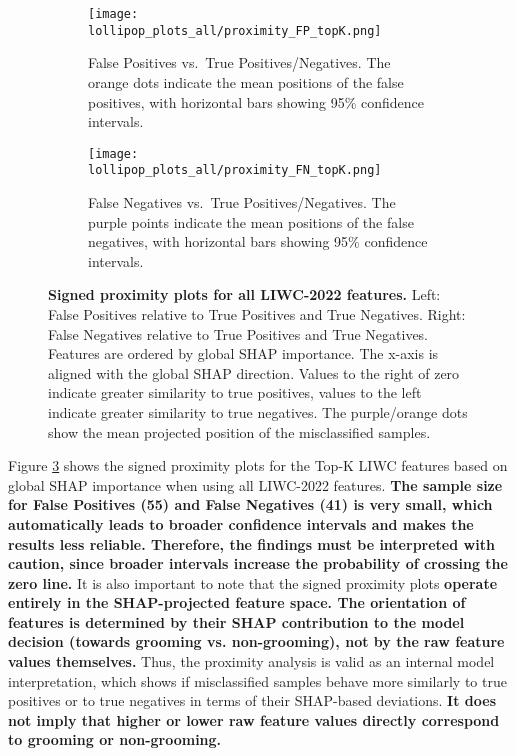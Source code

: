 \begin{figure}[H]
  \centering

  \begin{subfigure}[t]{0.49\textwidth}
    \centering
    \texttt{[image: lollipop\_plots\_all/proximity\_FP\_topK.png]}
    \caption{False Positives vs.\ True Positives/Negatives. The \textcolor{orange!70!black}{orange} dots indicate the mean positions of the false positives, with horizontal bars showing 95\% confidence intervals.}
    \label{fig:lollipop_fp_all}
  \end{subfigure}\hfill
  \begin{subfigure}[t]{0.49\textwidth}
    \centering
    \texttt{[image: lollipop\_plots\_all/proximity\_FN\_topK.png]}
    \caption{False Negatives vs.\ True Positives/Negatives. The \textcolor{purple!70!black}{purple points} indicate the mean positions of the false negatives, with horizontal bars showing 95\% confidence intervals.}
    \label{fig:lollipop_fn_all}
  \end{subfigure}

  \caption[Signed proximity plots for all LIWC-2022 features.]{\textbf{Signed proximity plots for all LIWC-2022 features.} 
  Left: False Positives relative to True Positives and True Negatives. 
  Right: False Negatives relative to True Positives and True Negatives. 
  Features are ordered by global SHAP importance. The x-axis is aligned with the global SHAP direction. Values to the right of zero indicate greater similarity to true positives, values to the left indicate greater similarity to true negatives. The purple/orange dots show the mean projected position of the misclassified samples.}
  \label{fig:lollipop_all}
\end{figure}

Figure \ref{fig:lollipop_all} shows the signed proximity plots for the Top-K LIWC features based on global SHAP importance when using all LIWC-2022 features. \textbf{The sample size for False Positives (55) and False Negatives (41) is very small, which automatically leads to broader confidence intervals and makes the results less reliable. Therefore, the findings must be interpreted with caution, since broader intervals increase the probability of crossing the zero line.} It is also important to note that the signed proximity plots \textbf{operate entirely in the SHAP-projected feature space. The orientation of features is determined by their SHAP contribution to the model decision (towards grooming vs. non-grooming), not by the raw feature values themselves.} Thus, the proximity analysis is valid as an internal model interpretation, which shows if misclassified samples behave more similarly to true positives or to true negatives in terms of their SHAP-based deviations. \textbf{It does not imply that higher or lower raw feature values directly correspond to grooming or non-grooming.}

